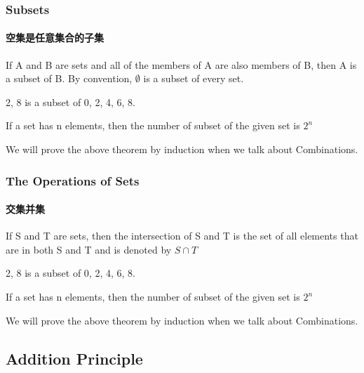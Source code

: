 \documentclass[
	11pt, %
	handout,
]{beamer}
\begin{document}

\begin{frame}
	\frametitle{Subsets} %
	\framesubtitle{空集是任意集合的子集}
	\begin{definition}
	If A and B are sets and all of the
members of A are also members of B, then A is a subset of B. By convention, $\emptyset$ is a subset of
every set.
	\end{definition}
	\begin{example}
		{2, 8} is a subset of {0, 2, 4, 6, 8}.
	\end{example}

	\begin{theorem}
		If a set has n elements, then the number of subset of the given set is $2^n$
	\end{theorem}
	\alert{We will prove the above theorem by induction when we talk about Combinations.}
\end{frame}



\begin{frame}
	\frametitle{The Operations of Sets} %
	\framesubtitle{交集并集}
	\begin{definition}
If S and T are sets, then the
intersection of S and T is the set of all elements that are in both S and T and
is denoted by $S\cap	T$
	\end{definition}
	\begin{example}
		{2, 8} is a subset of {0, 2, 4, 6, 8}.
	\end{example}

	\begin{theorem}
		If a set has n elements, then the number of subset of the given set is $2^n$
	\end{theorem}
	\alert{We will prove the above theorem by induction when we talk about Combinations.}
\end{frame}


\subsection{Addition Principle}

\end{document}
